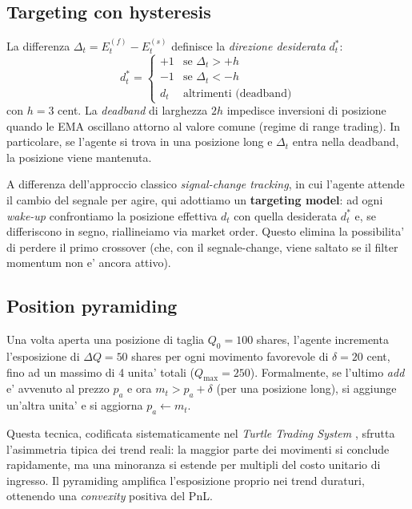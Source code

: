 \documentclass[11pt,a4paper]{article}
\begin{document}
\subsection{Targeting con hysteresis}

La differenza $\Delta_t = E^{(f)}_t - E^{(s)}_t$ definisce la
\emph{direzione desiderata} $d^*_t$:
\begin{equation}
    d^*_t = \begin{cases}
        +1 & \text{se } \Delta_t > +h \\
        -1 & \text{se } \Delta_t < -h \\
        d_t & \text{altrimenti (deadband)}
    \end{cases}
    \label{eq:hysteresis}
\end{equation}
con $h = 3$ cent.  La \emph{deadband} di larghezza $2h$ impedisce
inversioni di posizione quando le EMA oscillano attorno al valore
comune (regime di range trading).  In particolare, se l'agente si
trova in una posizione long e $\Delta_t$ entra nella deadband, la
posizione viene mantenuta.

A differenza dell'approccio classico \emph{signal-change tracking},
in cui l'agente attende il cambio del segnale per agire, qui
adottiamo un \textbf{targeting model}: ad ogni \emph{wake-up}
confrontiamo la posizione effettiva $d_t$ con quella desiderata
$d^*_t$ e, se differiscono in segno, riallineiamo via market order.
Questo elimina la possibilita' di perdere il primo crossover (che,
con il segnale-change, viene saltato se il filter momentum non e'
ancora attivo).

\subsection{Position pyramiding}

Una volta aperta una posizione di taglia $Q_0 = 100$ shares, l'agente
incrementa l'esposizione di $\Delta Q = 50$ shares per ogni
movimento favorevole di $\delta = 20$ cent, fino ad un massimo di 4
unita' totali ($Q_{\max} = 250$).  Formalmente, se l'ultimo
\emph{add} e' avvenuto al prezzo $p_a$ e ora $m_t > p_a + \delta$ (per
una posizione long), si aggiunge un'altra unita' e si aggiorna
$p_a \leftarrow m_t$.

Questa tecnica, codificata sistematicamente nel \emph{Turtle Trading
System} \cite{covel2007turtle}, sfrutta l'asimmetria tipica dei
trend reali: la maggior parte dei movimenti si conclude rapidamente,
ma una minoranza si estende per multipli del costo unitario di
ingresso.  Il pyramiding amplifica l'esposizione proprio nei trend
duraturi, ottenendo una \emph{convexity} positiva del PnL.
\end{document}
